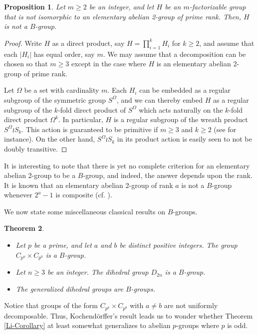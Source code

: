 \documentclass[12pt]{amsart}
\newtheorem{theorem}{Theorem}[section]
\newtheorem{proposition}[theorem]{Proposition}
\theoremstyle{definition}
\begin{document}
	\begin{proposition}\label{W25-7}
		Let $m \geq 2$ be an integer, and let $H$ be an $m$-factorizable group that is not isomorphic to an elementary abelian 2-group of prime rank. Then, $H$ is not a $B$-group. 
	\end{proposition}
	\begin{proof}
		Write $H$ as a direct product, say $H = \prod_{i=1}^k H_i$ for $k \geq 2$, and assume that each $|H_i|$ has equal order, say $m$. We may assume that a decomposition can be chosen so that $m \geq 3$ except in the case where $H$ is an elementary abelian 2-group of prime rank. 
		
		Let $\Omega$ be a set with cardinality $m$. Each $H_i$ can be embedded as a regular subgroup of the symmetric group $S^\Omega$, and we can thereby embed $H$ as a regular subgroup of the $k$-fold direct product of $S^\Omega$ which acts naturally on the $k$-fold direct product $\Omega^k$. In particular, $H$ is a regular subgroup of the wreath product $S^\Omega \wr S_k$. This action is guaranteed to be primitive if $m \geq 3$ and $k \geq 2$ (see \cite[Lemma 2.7A]{DM} for instance). On the other hand, $S^\Omega \wr S_k$ in its product action is easily seen to not be doubly transitive.
	\end{proof}
	It is interesting to note that there is yet no complete criterion for an elementary abelian 2-group to be a $B$-group, and indeed, the answer depends upon the rank. It is known that an elementary abelian 2-group of rank $a$ is not a $B$-group whenever $2^a - 1$ is composite (cf. \cite{Wild2}).
	
	We now state some miscellaneous classical results on $B$-groups.
	\begin{theorem} \label{Kochs-thm}
		\hspace{1cm}
	\begin{itemize}
		\item[(i)] [Kochend\"orffer, 1937]	Let $p$ be a prime, and let $a$ and $b$ be distinct positive integers. The group $C_{p^a} \times C_{p^b}$ is a $B$-group. \cite{Koch}
		\item[(ii)] [Wielandt, 1950] Let $n \geq 3$ be an integer. The dihedral group $D_{2n}$ is a $B$-group. \cite{W2}
		\item[(iii)] [Scott, 1957] The generalized dihedral groups are $B$-groups. \cite{Scott}
	\end{itemize}
	\end{theorem}
	
	Notice that groups of the form $C_{p^a} \times C_{p^b}$ with $a \neq b$ are not uniformly decomposable. Thus, Kochend\"orffer's result leads us to wonder whether Theorem \ref{Li-Corollary} at least somewhat generalizes to abelian $p$-groups where $p$ is odd. 
	
\end{document}
